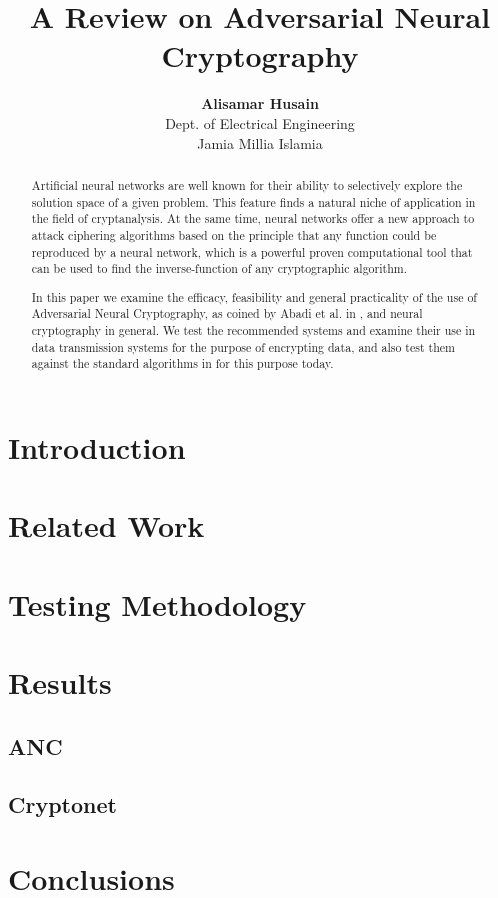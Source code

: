 \documentclass[12pt]{article}
\title{A Review on Adversarial Neural Cryptography}
\author{
  {\bf Alisamar Husain}\\
  Dept. of Electrical Engineering\\
  Jamia Millia Islamia
}
\date{}
\begin{document}
  \maketitle

  \begin{abstract}
    Artificial neural networks are well known for their ability to selectively explore the solution
    space of a given problem. This feature finds a natural niche of application in the field
    of cryptanalysis. At the same time, neural networks offer a new approach to attack ciphering
    algorithms based on the principle that any function could be reproduced by a neural network,
    which is a powerful proven computational tool that can be used to find the inverse-function of
    any cryptographic algorithm.

    In this paper we examine the efficacy, feasibility and 
    general practicality of the use of Adversarial Neural Cryptography, 
    as coined by Abadi et al. in \cite{seminalanc}, and neural cryptography
    in general. We test the recommended systems and examine their use in 
    data transmission systems for the purpose of encrypting data, and also test
    them against the standard algorithms in for this purpose today.
  \end{abstract}
 
  \section{Introduction}
  
  \section{Related Work}
  
  \section{Testing Methodology}
  \lipsum
  
  \section{Results}
    \subsection{ANC}
    \subsection{Cryptonet}
  
  \section{Conclusions}

  
  
\end{document}
